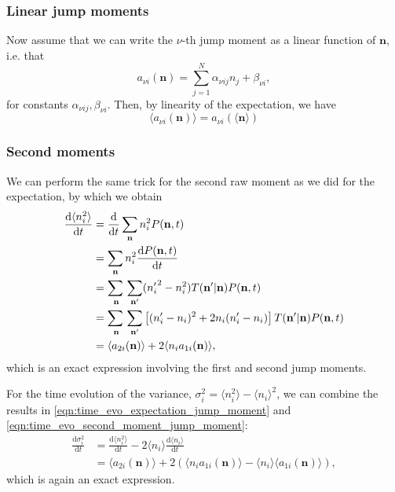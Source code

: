 \documentclass[a4paper,11pt]{article}
\numberwithin{equation}{section}
\newcommand{\diff}[2]{\frac{\mathrm{d} #1}{\mathrm{d} #2}}
\newcommand{\V}[1]{\mathbf{#1}}
\newcommand{\E}[1]{\langle #1 \rangle}
\begin{document}
\subsubsection{Linear jump moments}
Now assume that we can write the \(\nu\)-th jump moment as a linear function of
\(\V{n}\), i.e. that
\begin{equation}
    a_{\nu i}(\V{n}) = \sum_{j=1}^{N} \alpha_{\nu i j} n_j + \beta_{\nu i},
    \label{eqn:linear_jump_moments_coeffs}
\end{equation}
for constants \(\alpha_{\nu i j}, \beta_{\nu i}\).
Then, by linearity of the expectation, we have
\begin{equation}
    \E{a_{\nu i}(\V{n})} = a_{\nu i}(\E{\V{n}})
    \label{eqn:linear_jump_moments}
\end{equation}

\subsubsection{Second moments}
We can perform the same trick for the second raw moment as we did for the
expectation, by which we obtain
\begin{equation}
    \begin{aligned}
        \diff{\E{n_i^2}}{t} &= \diff{}{t} \sum_{\V{n}} n_i^2 P(\V{n},t)\\
        &= \sum_{\V{n}} n_i^2 \diff{P(\V{n},t)}{t}\\
        &= \adjustlimits\sum_{\V{n}} \sum_{\V{n}'} ({n_i'}^2 - n_i^2) T(\V{n}' |
        \V{n}) P(\V{n},t)\\
        &= \adjustlimits\sum_{\V{n}} \sum_{\V{n}'} \left[ (n_i' - n_i)^2 + 2n_i(n_i'
        - n_i) \right] T(\V{n}' | \V{n}) P(\V{n},t)\\
        &= \E{a_{2i}(\V{n})} + 2 \E{n_i a_{1i}(\V{n})},
    \end{aligned}
    \label{eqn:time_evo_second_moment_jump_moment}
\end{equation}
which is an exact expression involving the first and second jump moments.

For the time evolution of the variance, \(\sigma_i^2 = \E{n_i^2} - \E{n_i}^2\),
we can combine the results in \eqref{eqn:time_evo_expectation_jump_moment} and
\eqref{eqn:time_evo_second_moment_jump_moment}:
\begin{equation}
    \begin{aligned}
        \diff{\sigma_i^2}{t} &= \diff{\E{n_i^2}}{t} - 2 \E{n_i}\diff{\E{n_i}}{t}\\
        &= \E{a_{2i}(\V{n})} + 2\left( \E{n_i a_{1i}(\V{n})} - \E{n_i}
        \E{a_{1i}(\V{n})} \right),
    \end{aligned}
    \label{eqn:time_evo_variance_jump_moment}
\end{equation}
which is again an exact expression.
\end{document}
